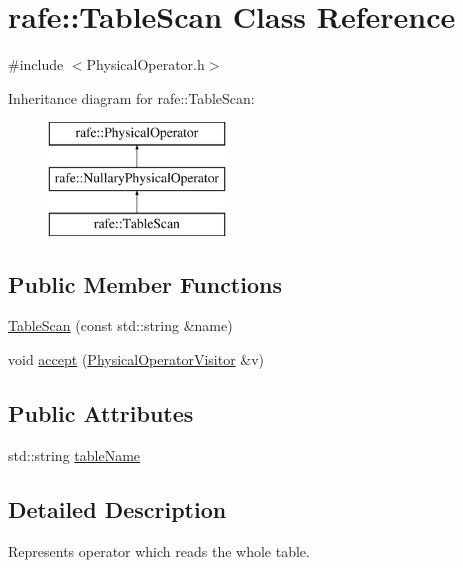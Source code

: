 \hypertarget{classrafe_1_1_table_scan}{\section{rafe\+:\+:Table\+Scan Class Reference}
\label{classrafe_1_1_table_scan}
}


{\ttfamily \#include $<$Physical\+Operator.\+h$>$}

Inheritance diagram for rafe\+:\+:Table\+Scan\+:\begin{figure}[H]
\begin{center}
\leavevmode
\includegraphics[height=3.000000cm]{classrafe_1_1_table_scan}
\end{center}
\end{figure}
\subsection*{Public Member Functions}
\begin{DoxyCompactItemize}
\item 
\hyperlink{classrafe_1_1_table_scan_a901990982dfd163e3154d6dfab40b6f8}{Table\+Scan} (const std\+::string \&name)
\item 
void \hyperlink{classrafe_1_1_table_scan_a87cd9f9b093f153bd95b39bc3ea18678}{accept} (\hyperlink{classrafe_1_1_physical_operator_visitor}{Physical\+Operator\+Visitor} \&v)
\end{DoxyCompactItemize}
\subsection*{Public Attributes}
\begin{DoxyCompactItemize}
\item 
std\+::string \hyperlink{classrafe_1_1_table_scan_a594b9df476c4abc0e74cc9ded1101978}{table\+Name}
\end{DoxyCompactItemize}


\subsection{Detailed Description}
Represents operator which reads the whole table. 


